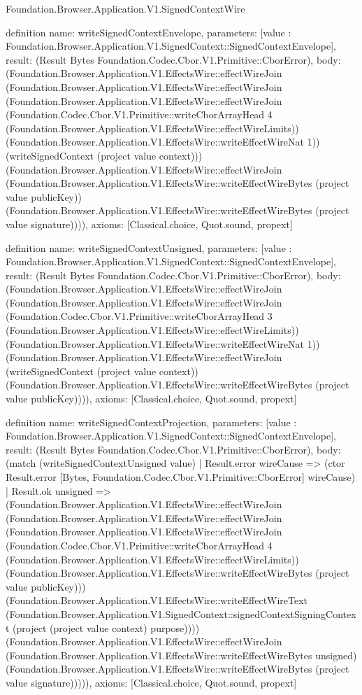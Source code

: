 \begin{lexlean}{Foundation.Browser.Application.V1.SignedContextWire}
\begin{semanticmodule}
definition{
  name: writeSignedContextEnvelope,
  parameters: [value : Foundation.Browser.Application.V1.SignedContext::SignedContextEnvelope],
  result: (Result Bytes Foundation.Codec.Cbor.V1.Primitive::CborError),
  body: (Foundation.Browser.Application.V1.EffectsWire::effectWireJoin (Foundation.Browser.Application.V1.EffectsWire::effectWireJoin (Foundation.Browser.Application.V1.EffectsWire::effectWireJoin (Foundation.Codec.Cbor.V1.Primitive::writeCborArrayHead 4 (Foundation.Browser.Application.V1.EffectsWire::effectWireLimits)) (Foundation.Browser.Application.V1.EffectsWire::writeEffectWireNat 1)) (writeSignedContext (project value context))) (Foundation.Browser.Application.V1.EffectsWire::effectWireJoin (Foundation.Browser.Application.V1.EffectsWire::writeEffectWireBytes (project value publicKey)) (Foundation.Browser.Application.V1.EffectsWire::writeEffectWireBytes (project value signature)))),
  axioms: [Classical.choice, Quot.sound, propext]
}

definition{
  name: writeSignedContextUnsigned,
  parameters: [value : Foundation.Browser.Application.V1.SignedContext::SignedContextEnvelope],
  result: (Result Bytes Foundation.Codec.Cbor.V1.Primitive::CborError),
  body: (Foundation.Browser.Application.V1.EffectsWire::effectWireJoin (Foundation.Browser.Application.V1.EffectsWire::effectWireJoin (Foundation.Codec.Cbor.V1.Primitive::writeCborArrayHead 3 (Foundation.Browser.Application.V1.EffectsWire::effectWireLimits)) (Foundation.Browser.Application.V1.EffectsWire::writeEffectWireNat 1)) (Foundation.Browser.Application.V1.EffectsWire::effectWireJoin (writeSignedContext (project value context)) (Foundation.Browser.Application.V1.EffectsWire::writeEffectWireBytes (project value publicKey)))),
  axioms: [Classical.choice, Quot.sound, propext]
}

definition{
  name: writeSignedContextProjection,
  parameters: [value : Foundation.Browser.Application.V1.SignedContext::SignedContextEnvelope],
  result: (Result Bytes Foundation.Codec.Cbor.V1.Primitive::CborError),
  body: (match (writeSignedContextUnsigned value)
    | Result.error wireCause => (ctor Result.error [Bytes, Foundation.Codec.Cbor.V1.Primitive::CborError] wireCause)
    | Result.ok unsigned => (Foundation.Browser.Application.V1.EffectsWire::effectWireJoin (Foundation.Browser.Application.V1.EffectsWire::effectWireJoin (Foundation.Browser.Application.V1.EffectsWire::effectWireJoin (Foundation.Codec.Cbor.V1.Primitive::writeCborArrayHead 4 (Foundation.Browser.Application.V1.EffectsWire::effectWireLimits)) (Foundation.Browser.Application.V1.EffectsWire::writeEffectWireBytes (project value publicKey))) (Foundation.Browser.Application.V1.EffectsWire::writeEffectWireText (Foundation.Browser.Application.V1.SignedContext::signedContextSigningContext (project (project value context) purpose)))) (Foundation.Browser.Application.V1.EffectsWire::effectWireJoin (Foundation.Browser.Application.V1.EffectsWire::writeEffectWireBytes unsigned) (Foundation.Browser.Application.V1.EffectsWire::writeEffectWireBytes (project value signature))))),
  axioms: [Classical.choice, Quot.sound, propext]
}


\end{semanticmodule}
\end{lexlean}
